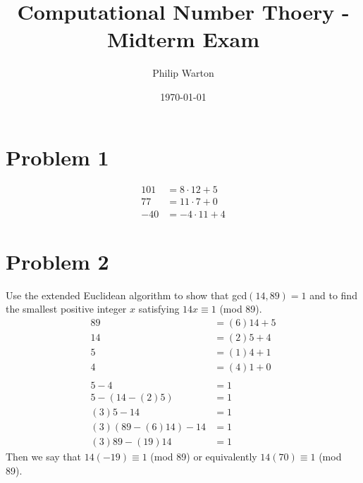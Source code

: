 \documentclass{article}
\theoremstyle{definition}
\begin{document}
\title{Computational Number Thoery - Midterm Exam}
\author{Philip Warton}
\date{\today}
\maketitle
\section*{Problem 1}
\begin{align*}
    101 & = 8 \cdot 12 + 5 \\
    77 & = 11 \cdot 7 + 0 \\
    -40 & = -4 \cdot 11 + 4
\end{align*}
\section*{Problem 2}
Use the extended Euclidean algorithm to show that gcd$(14,89) = 1$ and to find
the smallest positive integer $x$ satisfying $14x \equiv 1 $ (mod 89).
\begin{align*}
    89 & = (6)14 + 5 \\
    14 & = (2)5 + 4 \\
    5 & = (1)4 + 1 \\
    4 & = (4)1 + 0 \\\\
    5 - 4 & = 1 \\
    5 - (14 - (2)5) & = 1 \\
    (3)5 - 14 & = 1 \\
    (3)(89 - (6)14) - 14 & = 1 \\
    (3)89 - (19)14 & = 1
\end{align*}
Then we say that $14(-19) \equiv 1$ (mod 89) or equivalently $14(70) \equiv 1$ (mod 89).
\end{document}
